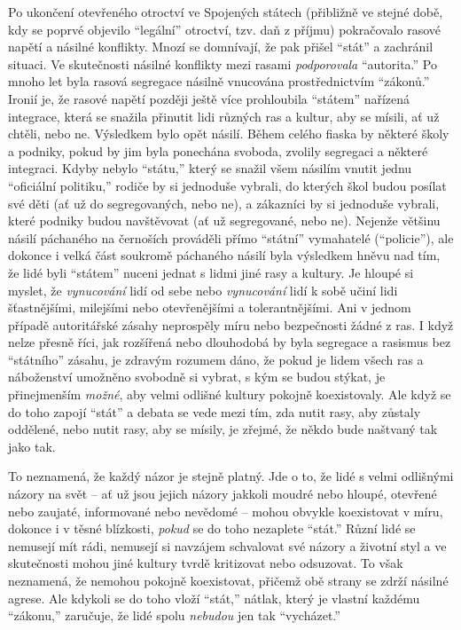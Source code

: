 \documentclass{book}
\begin{document}
Po ukončení otevřeného otroctví ve Spojených státech (přibližně ve stejné době, kdy se poprvé objevilo \enquote{legální} otroctví, tzv. daň z příjmu) pokračovalo rasové napětí a násilné konflikty. Mnozí se domnívají, že pak přišel \enquote{stát} a zachránil situaci. Ve skutečnosti násilné konflikty mezi rasami \emph{podporovala} \enquote{autorita.} Po mnoho let byla rasová segregace násilně vnucována prostřednictvím \enquote{zákonů.} Ironií je, že rasové napětí později ještě více prohloubila \enquote{státem} nařízená integrace, která se snažila přinutit lidi různých ras a kultur, aby se mísili, ať už chtěli, nebo ne. Výsledkem bylo opět násilí. Během celého fiaska by některé školy a podniky, pokud by jim byla ponechána svoboda, zvolily segregaci a některé integraci. Kdyby nebylo \enquote{státu,} který se snažil všem násilím vnutit jednu \enquote{oficiální politiku,} rodiče by si jednoduše vybrali, do kterých škol budou posílat své děti (ať už do segregovaných, nebo ne), a zákazníci by si jednoduše vybrali, které podniky budou navštěvovat (ať už segregované, nebo ne). Nejenže většinu násilí páchaného na černoších prováděli přímo \enquote{státní} vymahatelé (\enquote{policie}), ale dokonce i velká část soukromě páchaného násilí byla výsledkem hněvu nad tím, že lidé byli \enquote{státem} nuceni jednat s lidmi jiné rasy a kultury. Je hloupé si myslet, že \emph{vynucování} lidí od sebe nebo \emph{vynucování} lidí k sobě učiní lidi šťastnějšími, milejšími nebo otevřenějšími a tolerantnějšími. Ani v jednom případě autoritářské zásahy neprospěly míru nebo bezpečnosti žádné z ras. I když nelze přesně říci, jak rozšířená nebo dlouhodobá by byla segregace a rasismus bez \enquote{státního} zásahu, je zdravým rozumem dáno, že pokud je lidem všech ras a náboženství umožněno svobodně si vybrat, s kým se budou stýkat, je přinejmenším \emph{možné}, aby velmi odlišné kultury pokojně koexistovaly. Ale když se do toho zapojí \enquote{stát} a debata se vede mezi tím, zda nutit rasy, aby zůstaly oddělené, nebo nutit rasy, aby se mísily, je zřejmé, že někdo bude naštvaný tak jako tak.

To neznamená, že každý názor je stejně platný. Jde o to, že lidé s velmi odlišnými názory na svět -- ať už jsou jejich názory jakkoli moudré nebo hloupé, otevřené nebo zaujaté, informované nebo nevědomé -- mohou obvykle koexistovat v míru, dokonce i v těsné blízkosti, \emph{pokud} se do toho nezaplete \enquote{stát.} Různí lidé se nemusejí mít rádi, nemusejí si navzájem schvalovat své názory a životní styl a ve skutečnosti mohou jiné kultury tvrdě kritizovat nebo odsuzovat. To však neznamená, že nemohou pokojně koexistovat, přičemž obě strany se zdrží násilné agrese. Ale kdykoli se do toho vloží \enquote{stát,} nátlak, který je vlastní každému \enquote{zákonu,} zaručuje, že lidé spolu \emph{nebudou} jen tak \enquote{vycházet.}
\end{document}
